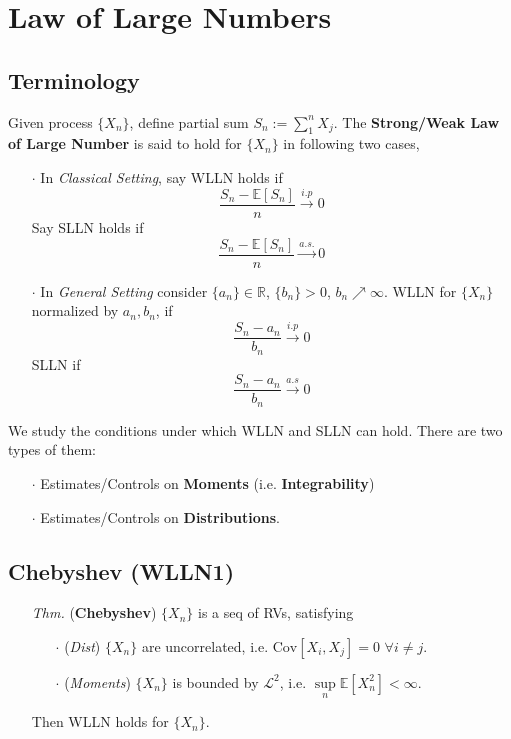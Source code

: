 \documentclass[a4paper,12pt,twoside]{book}
\begin{document}
\chapter{Law of Large Numbers}

\section{Terminology}
Given process $\{X_n\}$, define partial sum $S_n:= \sum_1^n X_j$. The \textbf{Strong/Weak Law of Large Number} is said to hold for $\{X_n\}$ in following two cases,

\begin{itemize}
	\item[$\cdot$] In \textit{Classical Setting}, say WLLN holds if 
	\begin{equation}
	 	\frac{S_n- \mathbb{E}\left[S_n\right]}{n} \xrightarrow{i.p} 0
	\end{equation} 
	Say SLLN holds if
	\begin{equation}
		\frac{S_n- \mathbb{E}\left[S_n\right]}{n} \xrightarrow{a.s.} 0
	\end{equation}

	\item[$\cdot$] In \textit{General Setting} consider $\{a_n\}\in \mathbb{R}$, $\{b_n\}>0$, $b_n \nearrow \infty$. WLLN for $\{X_n\}$ normalized by $a_n, b_n$, if
	\begin{equation}
		\frac{S_n- a_n}{b_n} \xrightarrow{i.p} 0
	\end{equation}
	SLLN if
	\begin{equation}
		\frac{S_n- a_n}{b_n} \xrightarrow{a.s} 0
	\end{equation}
\end{itemize}

We study the conditions under which WLLN and SLLN can hold. There are two types of them:
\begin{itemize}
	\item[$\cdot$] Estimates/Controls on \textbf{Moments} (i.e. \textbf{Integrability})
	\item[$\cdot$] Estimates/Controls on \textbf{Distributions}.
\end{itemize}

\section{Chebyshev (WLLN1)}
\begin{itemize}
	\item[\textit{Thm.}] (\textbf{Chebyshev}) $\{X_n\}$ is a seq of RVs, satisfying
	\begin{itemize}
		\item[$\cdot$] (\textit{Dist}) $\{X_n\}$ are uncorrelated, i.e. $\mathrm{Cov}\left[X_i, X_j\right]=0$ $\forall i\ne j$.
		\item[$\cdot$] (\textit{Moments}) $\{X_n\}$ is bounded by $\mathcal{L}^2$, i.e. $\sup\limits_{n}\mathbb{E}\left[X^2_n\right]< \infty$.
	\end{itemize}
	Then WLLN holds for $\{X_n\}$.
\end{itemize}
\end{document}
